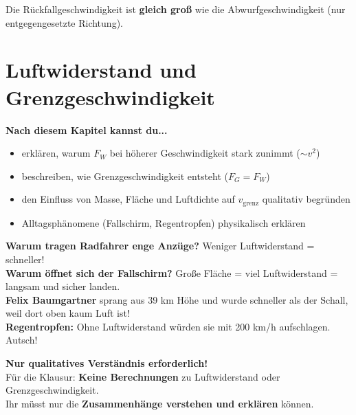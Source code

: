 \documentclass[11pt,a4paper]{article}
\begin{document}
\begin{merksatz}
Die Rückfallgeschwindigkeit ist \textbf{gleich groß} wie die Abwurfgeschwindigkeit (nur entgegengesetzte Richtung).
\end{merksatz}

\newpage
\section{Luftwiderstand und Grenzgeschwindigkeit}

\begin{tcolorbox}[colback=merkegreen!5, colframe=merkegreen, boxrule=0.5pt]
\textbf{Nach diesem Kapitel kannst du...}
\begin{itemize}[itemsep=1pt]
\item[$\checkmark$] erklären, warum $F_W$ bei höherer Geschwindigkeit stark zunimmt ($\sim v^2$)
\item[$\checkmark$] beschreiben, wie Grenzgeschwindigkeit entsteht ($F_G = F_W$)
\item[$\checkmark$] den Einfluss von Masse, Fläche und Luftdichte auf $v_{\text{grenz}}$ qualitativ begründen
\item[$\checkmark$] Alltagsphänomene (Fallschirm, Regentropfen) physikalisch erklären
\end{itemize}
\end{tcolorbox}

\begin{alltag}
\textbf{Warum tragen Radfahrer enge Anzüge?} Weniger Luftwiderstand = schneller!\\[0.3em]
\textbf{Warum öffnet sich der Fallschirm?} Große Fläche = viel Luftwiderstand = langsam und sicher landen.\\[0.3em]
\textbf{Felix Baumgartner} sprang aus 39 km Höhe und wurde schneller als der Schall, weil dort oben kaum Luft ist!\\[0.3em]
\textbf{Regentropfen:} Ohne Luftwiderstand würden sie mit 200 km/h aufschlagen. Autsch!
\end{alltag}

\begin{tcolorbox}[colback=tipporange!20, colframe=tipporange, boxrule=2pt]
\centering
\textbf{\large Nur qualitatives Verständnis erforderlich!}\\[0.3em]
\normalsize
Für die Klausur: \textbf{Keine Berechnungen} zu Luftwiderstand oder Grenzgeschwindigkeit.\\
Ihr müsst nur die \textbf{Zusammenhänge verstehen und erklären} können.
\end{tcolorbox}
\end{document}
